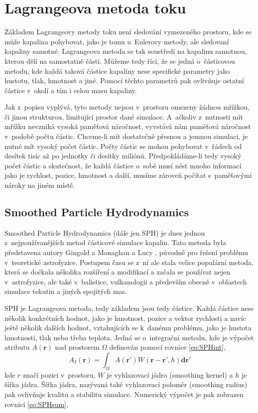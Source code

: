 \section{Lagrangeova metoda toku}
Základem Lagrangeovy metody toku není sledování vymezeného prostoru, kde se může kapalina pohybovat, jako je tomu u~Eulerovy metody, ale sledovaní kapaliny samotné. Lagrangeova metoda se tak soustředí na kapalinu samotnou, kterou dělí na samostatné části. Můžeme tedy říci, že se jedná o~částicovou metodu, kde každá taková částice kapaliny nese specifické parametry jako hustotu, tlak, hmotnost a jiné. Pomocí těchto parametrů pak ovlivňuje ostatní částice v~okolí a tím i celou masu kapaliny.

Jak z~popisu vyplývá, tyto metody nejsou v~prostoru omezeny žádnou mřížkou, či jinou strukturou, limitující prostor dané simulace. A~ačkoliv z~nutnosti mít mřížku nevzniká vysoká paměťová náročnost, vyvstává nám paměťová náročnost v~podobě počtu částic. Chceme-li mít dostatečně přesnou a jemnou simulaci, je nutné mít vysoký počet částic. Počty částic se mohou pohybovat v~řádech od desítek tisíc až po jednotky či desítky miliónů. Předpokládáme-li tedy vysoký počet částic a skutečnost, že každá částice o~sobě musí nést mnoho informací jako je rychlost, pozice, hmotnost a další, musíme zároveň počítat s~paměťovými nároky na jiném místě. 

\subsection{Smoothed Particle Hydrodynamics}
\label{chapter:SPH}
Smoothed Particle Hydrodynamics (dále jen SPH) je dnes jednou z~nejpoužívanějších metod částicové simulace kapalin. Tato metoda byla představena autory Gingold a Monaghan \cite{Monaghan77} a Lucy \cite{Lucy77}, původně pro řešení problému v~teoretické astrofyzice. Postupem času se z~ní ale stala velice populární metoda, která se dočkala několika rozšíření a modifikací a začala se používat nejen v~astrofyzice, ale také v~balistice, vulkanologii a především obecně v~oblastech simulace tekutin a jiných spojitých mas.

SPH je Lagrangeova metoda, tedy základem jsou tedy částice. Každá částice nese několik konkrétních hodnot, jako je hmotnost, pozice a vektor rychlosti a navíc ještě několik dalších hodnot, vztahujících se k~danému problému, jako je hustota hmotnosti, tlak nebo třeba teplota. Jedná se o~integrační metodu, kde je výpočet atributu $A(\mathbf{r})$ nad prostorem $\Omega$ definován pomocí rovnice \ref{eq:SPHint},
\begin{equation}
    A_I(\mathbf{r}) = \int_\Omega A(\mathbf{r}')W(\mathbf{r} - \mathbf{r'},h)\mathbf{dr}'
    \label{eq:SPHint}
\end{equation}
kde $r$ značí pozici v~prostoru, $W$ je vyhlazovací jádro (smoothing kernel) a $h$ je šířka jádra. Šířka jádra, nazývaná také vyhlazovací poloměr (smoothing radius) pak ovlivňuje kvalitu a stabilitu simulace.
Numerický výpočet je pak zobrazen rovnicí \ref{eq:SPHsum},

